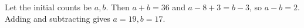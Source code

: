 Let the initial counts be $a,b$. Then $a+b=36$ and $a-8+3=b-3$, so $a-b=2$. Adding and subtracting gives $\boxed{a=19,b=17}$.
